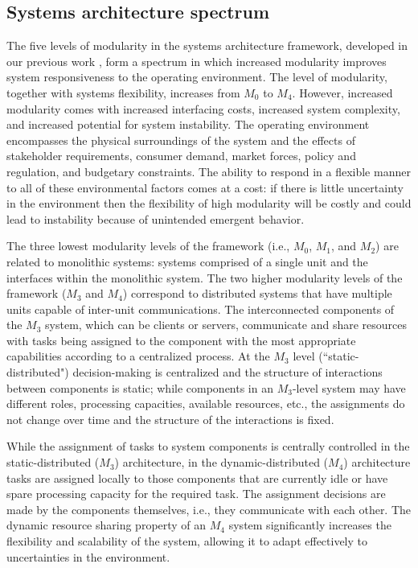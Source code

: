 \documentclass[journal,onecolumn]{IEEEtran}
\theoremstyle{plain}
\begin{document}
\subsection{Systems architecture spectrum}
The five levels of modularity in the systems architecture framework, developed in our previous work \citep{heydari2014,mosleh2015monolithic}, form a spectrum in which increased modularity improves system responsiveness to the operating environment. The level of modularity, together with systems flexibility, increases from $M_0$ to $M_4$. However, increased modularity comes with increased interfacing costs, increased system complexity, and increased potential for system instability. The operating environment encompasses the physical surroundings of the system and the effects of stakeholder requirements, consumer demand, market forces, policy and regulation, and budgetary constraints. The ability to respond in a flexible manner to all of these environmental factors comes at a cost: if there is little uncertainty in the environment then the flexibility of high modularity will be costly and could lead to instability because of unintended emergent behavior.

The three lowest modularity levels of the framework (i.e., $M_0$, $M_1$, and $M_2$) are related to monolithic systems: systems comprised of a single unit and the interfaces within the monolithic system. The two higher modularity levels of the framework ($M_3$ and $M_4$) correspond to distributed systems that have multiple units capable of inter-unit communications. The interconnected components of the $M_3$ system, which can be clients or servers, communicate and share resources with tasks being assigned to the component with the most appropriate capabilities according to a centralized process.  At the $M_3$ level (``static-distributed") decision-making is centralized and the structure of interactions between components is static; while components in an $M_3$-level system may have different roles, processing capacities, available resources, etc., the assignments do not change over time and the structure of the interactions is fixed. 

While the assignment of tasks to system components is centrally controlled in the static-distributed ($M_3$) architecture, in the dynamic-distributed ($M_4$) architecture tasks are assigned locally to those components that are currently idle or have spare processing capacity for the required task. The assignment decisions are made by the components themselves, i.e., they communicate with each other. The dynamic resource sharing property of an $M_4$ system significantly increases the flexibility and scalability of the system, allowing it to adapt effectively to uncertainties in the environment.
\end{document}
